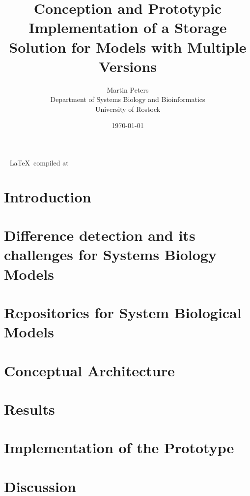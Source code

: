 \documentclass[12pt, a4paper, titlepage]{book}
\title{Conception and Prototypic Implementation of a Storage Solution for Models with Multiple Versions}
\author{Martin Peters\\[12pt]
	\small Department of Systems Biology and Bioinformatics\\
	\small University of Rostock}
\date{\today}
\begin{document}
	\maketitle
	\pagebreak
	~ \vfill
	{\hfill \tiny \LaTeX ~compiled at \DTMnow}
	\pagebreak
	\tableofcontents
	
	
	\chapter{Introduction}
	
	
	\chapter{Difference detection and its challenges for Systems Biology Models}
	
	
	\chapter{Repositories for System Biological Models}
	
	
	\chapter{Conceptual Architecture}
	
	
	\chapter{Results}
	
	
	\chapter{Implementation of the Prototype}
	
	
	\chapter{Discussion}
	
	
	
	
	
	\listoffigures
	\begin{appendices}
		\appendixpage
		\noappendicestocpagenum
		\addappheadtotoc
		
		
	\end{appendices}
\end{document}
